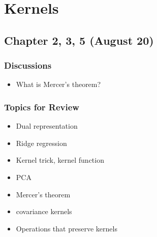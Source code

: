 \section{Kernels}

\subsection{Chapter 2, 3, 5 (August 20)}

\subsubsection*{Discussions}
\begin{itemize}
\item What is Mercer's theorem?
\end{itemize}

\subsubsection*{Topics for Review}
\begin{itemize}
\item Dual representation
\item Ridge regression
\item Kernel trick, kernel function
\item PCA
\item Mercer's theorem
\item covariance kernels
\item Operations that preserve kernels
\end{itemize}
